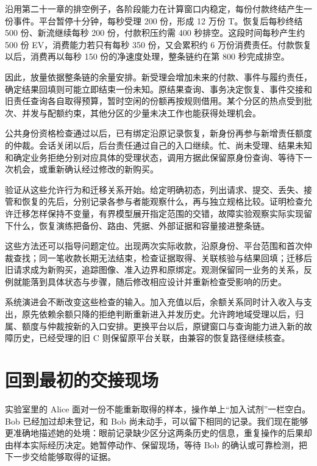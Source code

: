 沿用第二十一章的排空例子，各阶段能力在计算窗口内稳定，每份付款终结产生一份事件。平台暂停十分钟，每秒受理 200 份，形成 12 万份 T。恢复后每秒终结 500 份、新流继续每秒 200 份，付款积压约需 400 秒排空。这段时间每秒产生约 500 份 EV，消费能力若只有每秒 350 份，又会累积约 6 万份消费责任。付款恢复以后，消费再以每秒 150 份的净速度处理，整条链约在第 800 秒完成排空。

因此，放量依据整条链的余量安排。新受理会增加未来的付款、事件与履约责任，确定结果回填则可能立即结束一份未知。原结果查询、事务决定恢复、事件交接和旧责任查询各自取得预算，暂时空闲的份额再按规则借用。某个分区的热点受到批次、并发与配额约束，其他分区的少量未决工作也能获得处理机会。

公共身份资格检查通过以后，已有绑定沿原记录恢复，新身份再参与新增责任额度的仲裁。会话关闭以后，后台责任通过自己的入口继续。忙、尚未受理、结果未知和确定业务拒绝分别对应具体的受理状态，调用方据此保留原身份查询、等待下一次机会，或重新确认经过修改的新购买。

验证从这些允许行为和迁移关系开始。给定明确初态，列出请求、提交、丢失、接管和恢复的先后，分别记录各参与者能观察什么，再与独立规格比较。证明检查允许迁移怎样保持不变量，有界模型展开指定范围的交错，故障实验观察实际实现留下什么，恢复演练把备份、路由、凭据、外部证据和容量接进整条链。

这些方法还可以指导问题定位。出现两次实际收款，沿原身份、平台范围和首次仲裁查找；同一笔收款长期无法结束，检查证据取得、关联核验与结果回填；迁移后旧请求成为新购买，追踪图像、准入边界和原绑定。观测保留同一业务的关系，反例就能落到具体状态与步骤，随后修改相应设计并重新检查受影响的历史。

系统演进会不断改变这些检查的输入。加入充值以后，余额关系同时计入收入与支出，原先依赖余额只降的拒绝判断重新进入并发历史。允许跨地域受理以后，归属、额度与仲裁按新的入口安排。更换平台以后，原键窗口与查询能力进入新的故障历史，已经受理的旧 C 则保留原平台关联，由兼容的恢复路径继续核查。

\section*{回到最初的交接现场}

实验室里的 Alice 面对一份不能重新取得的样本，操作单上“加入试剂”一栏空白。Bob 已经加过却未登记，和 Bob 尚未动手，可以留下相同的记录。我们现在能够更准确地描述她的处境：眼前记录缺少区分这两条历史的信息，重复操作的后果却由样本实际经历决定。她暂停动作、保留现场，等待 Bob 的确认或可靠检测，把下一步交给能够取得的证据。

